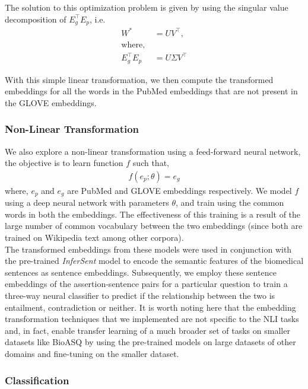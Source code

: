 The solution to this optimization problem is given by using the singular value decomposition of $E_g^{\intercal} E_p$, i.e.
\begin{align*}
    W^* &= UV^{\intercal}, \\
    \text{where, } \\
    E_g^{\intercal} E_p &= U \Sigma V^{\intercal}
\end{align*}

With this simple linear transformation, we then compute the transformed embeddings for all the words in the PubMed embeddings that are not present in the GLOVE embeddings. 

\subsubsection*{Non-Linear Transformation}

We also explore a non-linear transformation using a feed-forward neural network, the objective is to learn function $f$ such that,
\begin{align*}
    f(e_p; \theta) = e_g
\end{align*}
where, $e_p$ and $e_g$ are PubMed and GLOVE embeddings respectively. We model $f$ using a deep neural network with parameters $\theta$, and train using the common words in both the embeddings. The effectiveness of this training is a result of the large number of common vocabulary between the two embeddings (since both are trained on Wikipedia text among other corpora). \\

The transformed embeddings from these models were used in conjunction with the pre-trained \textit{InferSent} model to encode the semantic features of the biomedical sentences as sentence embeddings. Subsequently, we employ these sentence embeddings of the assertion-sentence pairs for a particular question to train a three-way neural classifier to predict if the relationship between the two is entailment, contradiction or neither. It is worth noting here that the embedding transformation techniques that we implemented are not specific to the NLI tasks and, in fact, enable transfer learning of a much broader set of tasks on smaller datasets like BioASQ by using the pre-trained models on large datasets of other domains and fine-tuning on the smaller dataset.

\subsubsection{Classification}

